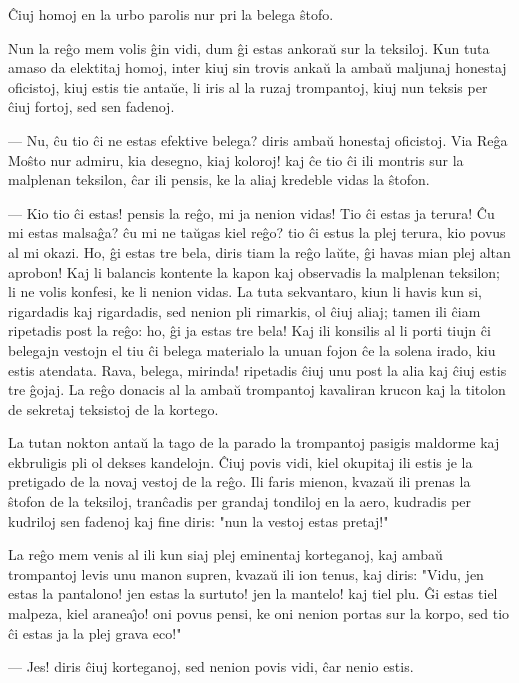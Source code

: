    \^Ciuj homoj en la urbo parolis nur pri la belega \^stofo.

   Nun la re\^go mem volis \^gin vidi, dum \^gi estas ankora\u u sur la
teksiloj. Kun tuta amaso da elektitaj homoj, inter kiuj sin trovis
anka\u u la amba\u u maljunaj honestaj oficistoj, kiuj estis tie
anta\u ue, li iris al la ruzaj trompantoj, kiuj nun teksis per
\^ciuj fortoj, sed sen fadenoj.

 --- Nu, \^cu tio \^ci ne estas efektive belega? diris amba\u u honestaj
oficistoj. Via Re\^ga Mo\^sto nur admiru, kia desegno, kiaj koloroj!
kaj \^ce tio \^ci ili montris sur la malplenan teksilon, \^car ili
pensis, ke la aliaj kredeble vidas la \^stofon.

 --- Kio tio \^ci estas! pensis la re\^go, mi ja nenion vidas! Tio \^ci
estas ja terura! \^Cu mi estas malsa\^ga? \^cu mi ne ta\u ugas kiel
re\^go? tio \^ci estus la plej terura, kio povus al mi okazi. Ho,
\^gi estas tre bela, diris tiam la re\^go la\u ute, \^gi havas mian
plej altan aprobon! Kaj li balancis kontente la kapon kaj observadis
la malplenan teksilon; li ne volis konfesi, ke li nenion vidas. La
tuta sekvantaro, kiun li havis kun si, rigardadis kaj rigardadis,
sed nenion pli rimarkis, ol \^ciuj aliaj; tamen ili \^ciam ripetadis
post la re\^go: ho, \^gi ja estas tre bela! Kaj ili konsilis al li
porti tiujn \^ci belegajn vestojn el tiu \^ci belega materialo la
unuan fojon \^ce la solena irado, kiu estis atendata. Rava, belega,
mirinda! ripetadis \^ciuj unu post la alia kaj \^ciuj estis tre
\^gojaj. La re\^go donacis al la amba\u u trompantoj kavaliran
krucon kaj la titolon de sekretaj teksistoj de la kortego.

   La tutan nokton anta\u u la tago de la parado la trompantoj pasigis
maldorme kaj ekbruligis pli ol dekses kandelojn. \^Ciuj povis vidi,
kiel okupitaj ili estis je la pretigado de la novaj vestoj de la
re\^go. Ili faris mienon, kvaza\u u ili prenas la \^stofon de la
teksiloj, tran\^cadis per grandaj tondiloj en la aero, kudradis per
kudriloj sen fadenoj kaj fine diris: "nun la vestoj estas pretaj!"

   La re\^go mem venis al ili kun siaj plej eminentaj korteganoj, kaj
amba\u u trompantoj levis unu manon supren, kvaza\u u ili ion tenus,
kaj diris: "Vidu, jen estas la pantalono! jen estas la surtuto! jen
la mantelo! kaj tiel plu. \^Gi estas tiel malpeza, kiel
aranea\^{\j}o! oni povus pensi, ke oni nenion portas sur la korpo,
sed tio \^ci estas ja la plej grava eco!"

 --- Jes! diris \^ciuj korteganoj, sed nenion povis vidi, \^car nenio
estis.

